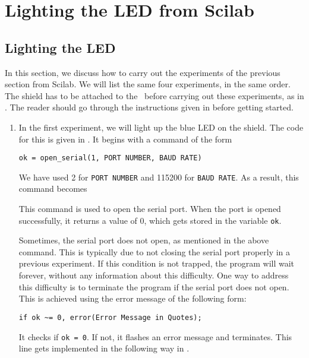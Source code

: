 \section{Lighting the LED from Scilab}
\subsection{Lighting the LED}
\label{sec:light-sci}
In this section, we discuss how to carry out the experiments of the
previous section from Scilab.  We will list the same four experiments,
in the same order.  The shield has to be attached to the \arduino\
before carrying out these experiments, as in .
The reader should go through the instructions given in
 before getting started. 
\begin{enumerate}
  \item In the first experiment, we will light up the blue LED on the
        shield.  The code for this is given in \sciref{sci:led-blue}.  It
        begins with a command of the form
        \begin{lstlisting}[style=nonumbers]
     ok = open_serial(1, PORT NUMBER, BAUD RATE)
  \end{lstlisting}
        We have used 2 for {\tt PORT NUMBER} and 115200 for {\tt BAUD RATE}.
        As a result, this command becomes
        
        This command is used to open the serial port.  When the port is
        opened successfully, it returns a value of 0, which gets stored in
        the variable {\tt ok}.
        
        Sometimes, the serial port does not open, as mentioned in the above
        command.  This is typically due to not closing the serial port
        properly in a previous experiment.  If this condition is not
        trapped, the program will wait forever, without any information
        about this difficulty.  One way to address this difficulty is to
        terminate the program if the serial port does not open.  This is
        achieved using the error message of the following form:
        \begin{lstlisting}[style=nonumbers]
     if ok ~= 0, error(Error Message in Quotes);
  \end{lstlisting}
        It checks if {\tt ok = 0}.  If not, it flashes an error message and
        terminates.  This line gets implemented in the following way in
        \sciref{sci:led-blue}.  
        
        

\end{enumerate}

